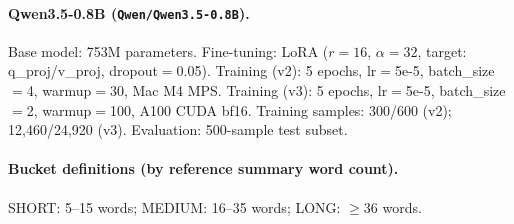 \documentclass[11pt,a4paper]{article}
\begin{document}
\paragraph{Qwen3.5-0.8B (\texttt{Qwen/Qwen3.5-0.8B}).}
Base model: 753M parameters.
Fine-tuning: LoRA ($r{=}16$, $\alpha{=}32$, target: q\_proj/v\_proj, dropout$=$0.05).
Training (v2): 5 epochs, lr$=$5e-5, batch\_size$=$4, warmup$=$30, Mac M4 MPS.
Training (v3): 5 epochs, lr$=$5e-5, batch\_size$=$2, warmup$=$100, A100 CUDA bf16.
Training samples: 300/600 (v2); 12,460/24,920 (v3).
Evaluation: 500-sample test subset.

\paragraph{Bucket definitions (by reference summary word count).}
SHORT: 5--15 words; MEDIUM: 16--35 words; LONG: $\geq$36 words.
\end{document}
